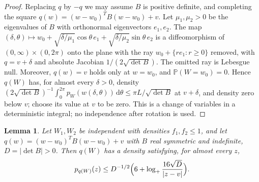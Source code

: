 \documentclass[11pt]{amsart}
\numberwithin{equation}{section}
\newtheorem{lemma}[theorem]{Lemma}
\theoremstyle{definition}
\theoremstyle{remark}
\newcommand{\PP}{\mathbb P}
\newcommand{\1}{\mathbf 1}
\newcommand{\dd}{\,\mathrm d}
\newcommand{\logp}{\log_+}
\newcommand{\abs}[1]{\lvert #1\rvert}
\begin{document}
\begin{proof}
Replacing $q$ by $-q$ we may assume $B$ is positive definite, and completing the square $q(w)=(w-w_0)^TB(w-w_0)+v$. Let $\mu_1,\mu_2>0$ be the eigenvalues of $B$ with orthonormal eigenvectors $e_1,e_2$. The map $(\delta,\theta)\mapsto w_0+\sqrt{\delta/\mu_1}\cos\theta\,e_1+\sqrt{\delta/\mu_2}\sin\theta\,e_2$ is a diffeomorphism of $(0,\infty)\times(0,2\pi)$ onto the plane with the ray $w_0+\{r e_1:r\ge0\}$ removed, with $q=v+\delta$ and absolute Jacobian $1/(2\sqrt{\det B})$. The omitted ray is Lebesgue null. Moreover, $q(w)=v$ holds only at $w=w_0$, and $\PP(W=w_0)=0$. Hence $q(W)$ has, for almost every $\delta>0$, density $(2\sqrt{\det B})^{-1}\int_0^{2\pi}p_W(w(\delta,\theta))\dd\theta\le\pi L/\sqrt{\det B}$ at $v+\delta$, and density zero below $v$; choose its value at $v$ to be zero. This is a change of variables in a deterministic integral; no independence after rotation is used.
\end{proof}

\begin{lemma}\label{lem:hyperbola}
Let $W_1,W_2$ be independent with densities $f_1,f_2\le1$, and let $q(w)=(w-w_0)^TB(w-w_0)+v$ with $B$ real symmetric and indefinite, $D=\abs{\det B}>0$. Then $q(W)$ has a density satisfying, for almost every $z$,
\begin{equation}\label{eq:hyperbola}
p_{q(W)}(z)\le D^{-1/2}\Bigl(6+\logp\frac{16\sqrt D}{\abs{z-v}}\Bigr).
\end{equation}
\end{lemma}
\end{document}
